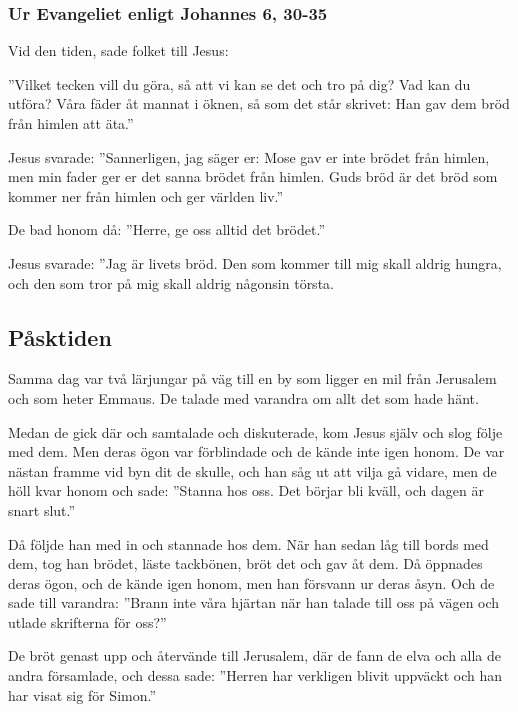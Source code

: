 \subsubsection*{Ur Evangeliet enligt Johannes \hfill{\color{rubrica}\small  6, 30-35} }
Vid den tiden, sade folket till Jesus:

”Vilket tecken vill du göra, så att vi kan se det och tro på dig? Vad kan du utföra? Våra fäder åt mannat i öknen, så som det står skrivet: Han gav dem bröd från himlen att äta.” 

Jesus svarade: ”Sannerligen, jag säger er: Mose gav er inte brödet från himlen, men min fader ger er det sanna brödet från himlen.  Guds bröd är det bröd som kommer ner från himlen och ger världen liv.” 

De bad honom då: ”Herre, ge oss alltid det brödet.” 

Jesus svarade: ”Jag är livets bröd. Den som kommer till mig skall aldrig hungra, och den som tror på mig skall aldrig någonsin törsta. 



\subsection{Påsktiden}

{Samma dag var två lärjungar på väg till en by som ligger en mil från Jerusalem och som heter Emmaus. De talade med varandra om allt det som hade hänt. }

Medan de gick där och samtalade och diskuterade, kom Jesus själv och slog följe med dem. Men deras ögon var förblindade och de kände inte igen honom. 
De var nästan framme vid byn dit de skulle, och han såg ut att vilja gå vidare, men de höll kvar honom och sade: ”Stanna hos oss. Det börjar bli kväll, och dagen är snart slut.” 

Då följde han med in och stannade hos dem. 
När han sedan låg till bords med dem, tog han brödet, läste tackbönen, bröt det och gav åt dem. 
Då öppnades deras ögon, och de kände igen honom, men han försvann ur deras åsyn. Och de sade till varandra: ”Brann inte våra hjärtan när han talade till oss på vägen och utlade skrifterna för oss?”

De bröt genast upp och återvände till Jerusalem, där de fann de elva och alla de andra församlade, och dessa sade: ”Herren har verkligen blivit uppväckt och han har visat sig för Simon.”


